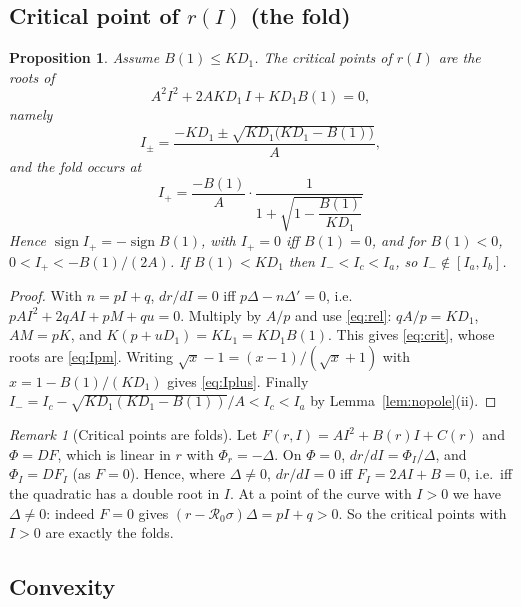 \documentclass[11pt]{article}
\newtheorem{proposition}[lemma]{Proposition}
\theoremstyle{remark}
\newtheorem{remark}[lemma]{Remark}
\newcommand{\R}{\mathcal R_0}
\begin{document}
\subsection{Critical point  of $r(I)$ (the fold)}

\begin{proposition}\label{prop:crit}
Assume $B(1)\le KD_1$. The critical points of $r(I)$ are the roots of
\begin{equation}
A^2I^2+2AKD_1\,I+KD_1B(1)=0,
\label{eq:crit}
\end{equation}
namely
\begin{equation}
I_\pm=\frac{-KD_1\pm\sqrt{KD_1\big(KD_1-B(1)\big)}}{A},
\label{eq:Ipm}
\end{equation}
and the fold occurs at
\begin{equation}
I_+=\frac{-B(1)}{A}\cdot\frac{1}{1+\sqrt{1-\dfrac{B(1)}{KD_1}}} %
\label{eq:Iplus}
\end{equation}
Hence $\operatorname{sign}I_+=-\operatorname{sign}B(1)$, with $I_+=0$ iff $B(1)=0$, and for $B(1)<0$, $0<I_+<-B(1)/(2A)$. If $B(1)<KD_1$ then $I_-<I_c<I_a$, so $I_-\notin[I_a,I_b]$.
\end{proposition}
\begin{proof}
With $n=pI+q$, $dr/dI=0$ iff $p\Delta-n\Delta'=0$, i.e.\ $pAI^2+2qAI+pM+qu=0$. Multiply by $A/p$ and use \eqref{eq:rel}: $qA/p=KD_1$, $AM=pK$, and $K(p+uD_1)=KL_1=KD_1B(1)$. This gives \eqref{eq:crit}, whose roots are \eqref{eq:Ipm}. Writing $\sqrt x-1=(x-1)/(\sqrt x+1)$ with $x=1-B(1)/(KD_1)$ gives \eqref{eq:Iplus}. Finally $I_-=I_c-\sqrt{KD_1(KD_1-B(1))}/A<I_c<I_a$ by Lemma~\ref{lem:nopole}(ii).
\end{proof}

\begin{remark}[Critical points are folds]\label{rem:critfold}
Let $F(r,I)=AI^2+B(r)I+C(r)$ and $\Phi=DF$, which is linear in $r$ with $\Phi_r=-\Delta$. On $\Phi=0$, $dr/dI=\Phi_I/\Delta$, and $\Phi_I=DF_I$ (as $F=0$). Hence, where $\Delta\ne0$, $dr/dI=0$ iff $F_I=2AI+B=0$, i.e.\ iff the quadratic has a double root in $I$. At a point of the curve with $I>0$ we have $\Delta\neq0$: indeed $F=0$ gives $(r-\R\sigma)\Delta=pI+q>0$. So the critical points with $I>0$ are exactly the folds.
\end{remark}

\subsection{Convexity}
\end{document}
